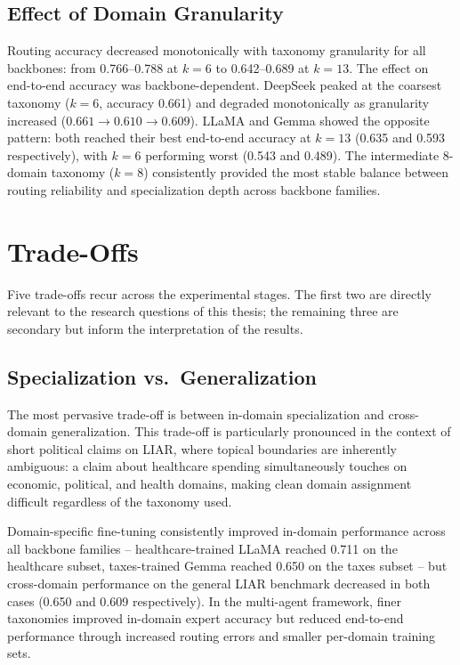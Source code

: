 \subsection{Effect of Domain Granularity}
\label{sec:domain_granularity}

Routing accuracy decreased monotonically with taxonomy granularity for all backbones: from 0.766--0.788 at $k{=}6$ to 0.642--0.689 at $k{=}13$. The effect on end-to-end accuracy was backbone-dependent. DeepSeek peaked at the coarsest taxonomy ($k{=}6$, accuracy 0.661) and degraded monotonically as granularity increased ($0.661 \to 0.610 \to 0.609$). LLaMA and Gemma showed 
the opposite pattern: both reached their best end-to-end accuracy at $k{=}13$ (0.635 and 0.593 respectively), with $k{=}6$ performing worst (0.543 and 0.489). The intermediate 8-domain taxonomy ($k{=}8$) consistently provided the most stable balance between routing reliability and specialization depth across backbone families.

\section{Trade-Offs}

Five trade-offs recur across the experimental stages. The first two are directly relevant to the research questions of this thesis; the remaining three are secondary but inform the interpretation of the results.

\subsection{Specialization vs.\ Generalization}

The most pervasive trade-off is between in-domain specialization and cross-domain generalization. This trade-off is particularly pronounced in the context of short political claims on LIAR, where topical boundaries are inherently ambiguous: a claim about healthcare spending simultaneously touches on economic, political, and health domains, making clean domain assignment difficult regardless of the taxonomy used.

Domain-specific fine-tuning consistently improved in-domain performance across all backbone families -- healthcare-trained LLaMA reached 0.711 on the healthcare subset, taxes-trained Gemma reached 0.650 on the taxes subset -- but cross-domain performance on the general LIAR benchmark decreased in both cases (0.650 and 0.609 respectively). In the multi-agent framework, finer taxonomies improved in-domain expert accuracy but reduced end-to-end performance through increased routing errors and smaller per-domain training sets.


